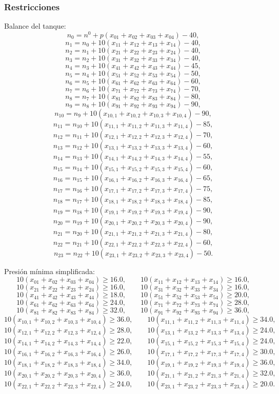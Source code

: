\documentclass[12pt,a4paper]{article}
\begin{document}
\subsubsection*{Restricciones}
Balance del tanque:
\[
n_0=n^{0}+p(x_{01}+x_{02}+x_{03}+x_{04})-40,
\]
\[
n_1=n_0+10(x_{11}+x_{12}+x_{13}+x_{14})-40,
\]
\[
n_2=n_1+10(x_{21}+x_{22}+x_{23}+x_{24})-40,
\]
\[
n_3=n_2+10(x_{31}+x_{32}+x_{33}+x_{34})-40,
\]
\[
n_4=n_3+10(x_{41}+x_{42}+x_{43}+x_{44})-45,
\]
\[
n_5=n_4+10(x_{51}+x_{52}+x_{53}+x_{54})-50,
\]
\[
n_6=n_5+10(x_{61}+x_{62}+x_{63}+x_{64})-60,
\]
\[
n_7=n_6+10(x_{71}+x_{72}+x_{73}+x_{74})-70,
\]
\[
n_8=n_7+10(x_{81}+x_{82}+x_{83}+x_{84})-80,
\]
\[
n_9=n_8+10(x_{91}+x_{92}+x_{93}+x_{94})-90,
\]
\[
n_{10}=n_9+10(x_{10,1}+x_{10,2}+x_{10,3}+x_{10,4})-90,
\]
\[
n_{11}=n_{10}+10(x_{11,1}+x_{11,2}+x_{11,3}+x_{11,4})-85,
\]
\[
n_{12}=n_{11}+10(x_{12,1}+x_{12,2}+x_{12,3}+x_{12,4})-70,
\]
\[
n_{13}=n_{12}+10(x_{13,1}+x_{13,2}+x_{13,3}+x_{13,4})-60,
\]
\[
n_{14}=n_{13}+10(x_{14,1}+x_{14,2}+x_{14,3}+x_{14,4})-55,
\]
\[
n_{15}=n_{14}+10(x_{15,1}+x_{15,2}+x_{15,3}+x_{15,4})-60,
\]
\[
n_{16}=n_{15}+10(x_{16,1}+x_{16,2}+x_{16,3}+x_{16,4})-65,
\]
\[
n_{17}=n_{16}+10(x_{17,1}+x_{17,2}+x_{17,3}+x_{17,4})-75,
\]
\[
n_{18}=n_{17}+10(x_{18,1}+x_{18,2}+x_{18,3}+x_{18,4})-85,
\]
\[
n_{19}=n_{18}+10(x_{19,1}+x_{19,2}+x_{19,3}+x_{19,4})-90,
\]
\[
n_{20}=n_{19}+10(x_{20,1}+x_{20,2}+x_{20,3}+x_{20,4})-90,
\]
\[
n_{21}=n_{20}+10(x_{21,1}+x_{21,2}+x_{21,3}+x_{21,4})-80,
\]
\[
n_{22}=n_{21}+10(x_{22,1}+x_{22,2}+x_{22,3}+x_{22,4})-60,
\]
\[
n_{23}=n_{22}+10(x_{23,1}+x_{23,2}+x_{23,3}+x_{23,4})-50.
\]

Presión mínima simplificada:
\[
10(x_{01}+x_{02}+x_{03}+x_{04})\ge 16.0,\qquad
10(x_{11}+x_{12}+x_{13}+x_{14})\ge 16.0,
\]
\[
10(x_{21}+x_{22}+x_{23}+x_{24})\ge 16.0,\qquad
10(x_{31}+x_{32}+x_{33}+x_{34})\ge 16.0,
\]
\[
10(x_{41}+x_{42}+x_{43}+x_{44})\ge 18.0,\qquad
10(x_{51}+x_{52}+x_{53}+x_{54})\ge 20.0,
\]
\[
10(x_{61}+x_{62}+x_{63}+x_{64})\ge 24.0,\qquad
10(x_{71}+x_{72}+x_{73}+x_{74})\ge 28.0,
\]
\[
10(x_{81}+x_{82}+x_{83}+x_{84})\ge 32.0,\qquad
10(x_{91}+x_{92}+x_{93}+x_{94})\ge 36.0,
\]
\[
10(x_{10,1}+x_{10,2}+x_{10,3}+x_{10,4})\ge 36.0,\qquad
10(x_{11,1}+x_{11,2}+x_{11,3}+x_{11,4})\ge 34.0,
\]
\[
10(x_{12,1}+x_{12,2}+x_{12,3}+x_{12,4})\ge 28.0,\qquad
10(x_{13,1}+x_{13,2}+x_{13,3}+x_{13,4})\ge 24.0,
\]
\[
10(x_{14,1}+x_{14,2}+x_{14,3}+x_{14,4})\ge 22.0,\qquad
10(x_{15,1}+x_{15,2}+x_{15,3}+x_{15,4})\ge 24.0,
\]
\[
10(x_{16,1}+x_{16,2}+x_{16,3}+x_{16,4})\ge 26.0,\qquad
10(x_{17,1}+x_{17,2}+x_{17,3}+x_{17,4})\ge 30.0,
\]
\[
10(x_{18,1}+x_{18,2}+x_{18,3}+x_{18,4})\ge 34.0,\qquad
10(x_{19,1}+x_{19,2}+x_{19,3}+x_{19,4})\ge 36.0,
\]
\[
10(x_{20,1}+x_{20,2}+x_{20,3}+x_{20,4})\ge 36.0,\qquad
10(x_{21,1}+x_{21,2}+x_{21,3}+x_{21,4})\ge 32.0,
\]
\[
10(x_{22,1}+x_{22,2}+x_{22,3}+x_{22,4})\ge 24.0,\qquad
10(x_{23,1}+x_{23,2}+x_{23,3}+x_{23,4})\ge 20.0.
\]
\end{document}
